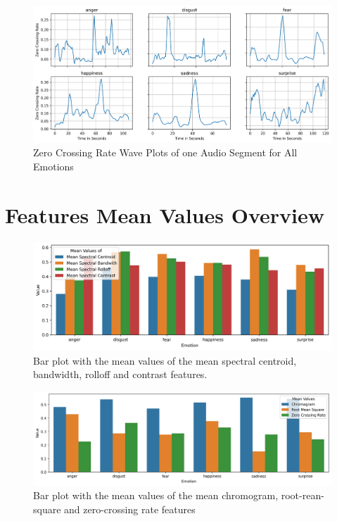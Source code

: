 \begin{figure}[H]
	\centering
	\includegraphics[width=.9\linewidth]{figs/appendix/feature_selection/zcrWP.png}
	\caption{Zero Crossing Rate Wave Plots of one Audio Segment for All Emotions}
	\label{fig:zcrWP}
\end{figure}

\section{Features Mean Values Overview}


\begin{figure}[H]
	\centering
	\includegraphics[width=\textwidth]{figs/appendix/feature_selection/meanSpectralFeatBarPlot.png}
	\caption{Bar plot with the mean values of the mean spectral centroid, bandwidth, rolloff and contrast features.}
	\label{fig:meanSpectralFeatBarPlot}
\end{figure}

\begin{center}
	\begin{figure}[H]
		\centering
		\includegraphics[width=1\linewidth]{figs/appendix/feature_selection/meanOtherFeatBarPlot.png}
		\caption{Bar plot with the mean values of the mean chromogram, root-rean-square and zero-crossing rate features}
		\label{fig:meanFeatBarPlot}
	\end{figure}
\end{center}

